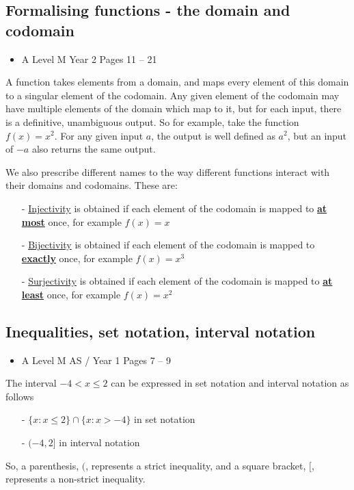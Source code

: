 \documentclass[11pt, a4paper]{article}
\begin{document}
\vspace{0.5cm}


\subsection{Formalising functions - the domain and codomain}
\label{formalisingfunctions}
\begin{itemize}
\item A Level M Year 2 \hspace{1cm} \phantom{ AS / } Pages 11 -- 21
\end{itemize} \par
A function takes elements from a domain, and maps every element of this domain to a singular element of the codomain. Any given element of the codomain may have multiple elements of the domain which map to it, but for each input, there is a definitive, unambiguous output. So for example, take the function $f(x)=x^{2}$. For any given input $a$, the output is well defined as $a^{2}$, but an input of $-a$ also returns the same output. \newline \par

We also prescribe different names to the way different functions interact with their domains and codomains. These are:
\begin{itemize}
\item[-] \underline{Injectivity} is obtained if each element of the codomain is mapped to \textbf{\underline{at most}} once, for example $f(x)=x$
\item[-] \underline{Bijectivity} is obtained if each element of the codomain is mapped to \textbf{\underline{exactly}} once, for example $f(x)=x^{3}$
\item[-] \underline{Surjectivity} is obtained if each element of the codomain is mapped to \textbf{\underline{at least}} once, for example $f(x)=x^{2}$
\end{itemize}
\vspace{0.5cm}


\subsection{Inequalities, set notation, interval notation}
\begin{itemize}
\item A Level M AS / Year 1 \hspace{1cm} \phantom{ } Pages 7 -- 9
\end{itemize}
The interval $-4<x\leq2$ can be expressed in set notation and interval notation as follows
\begin{itemize}
\item[-] $\{x:x\leq2\}\cap\{x:x>-4\}$ in set notation
\item[-] $(-4,2]$ in interval notation
\end{itemize}
So, a parenthesis, $($, represents a strict inequality, and a square bracket, $[$, represents a non-strict inequality.
\vspace{0.5cm}
\end{document}
